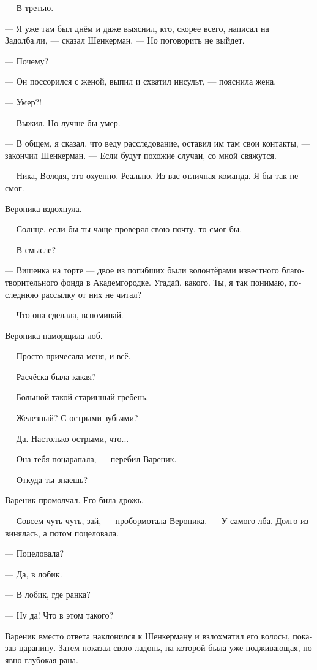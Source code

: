 \documentclass[a5paper,12pt,fleqn]{extbook}\usepackage{cooltooltips}\usepackage{polyglossia}\setdefaultlanguage[babelshorthands=true]{russian}\setotherlanguage{english}\defaultfontfeatures{Ligatures=TeX,Mapping=tex-text} \usepackage{xcolor}\definecolor{lightgray}{HTML}{bbbbbb}\color{lightgray}\newcommand{\ml}[3]{\textenglish{\textcolor{black}{#3}}}
\newcommand{\asterism}{\vspace{1em}{\centering\Large\bfseries$\ast~\ast~\ast$\par}\vspace{1em}}
\newcommand{\textspace}{\vspace{1em}{\centering\Large\bfseries<...>\par}\vspace{1em}}
\begin{document}
--- В третью.

--- Я уже там был днём и даже выяснил, кто, скорее всего, написал на Задолба.ли, --- сказал Шенкерман.
--- Но поговорить не выйдет.

--- Почему?

--- Он поссорился с женой, выпил и схватил инсульт, --- пояснила жена.

--- Умер?!

--- Выжил.
Но лучше бы умер.

--- В общем, я сказал, что веду расследование, оставил им там свои контакты, --- закончил Шенкерман.
--- Если будут похожие случаи, со мной свяжутся.

--- Ника, Володя, это охуенно.
Реально.
Из вас отличная команда.
Я бы так не смог.

Вероника вздохнула.

--- Солнце, если бы ты чаще проверял свою почту, то смог бы.

--- В смысле?

--- Вишенка на торте --- двое из погибших были волонтёрами известного благотворительного фонда в Академгородке.
Угадай, какого.
Ты, я так понимаю, последнюю рассылку от них не читал?

\asterism

\textspace

--- Что она сделала, вспоминай.

Вероника наморщила лоб.

--- Просто причесала меня, и всё.

--- Расчёска была какая?

--- Большой такой старинный гребень.

--- Железный?
С острыми зубьями?

--- Да.
Настолько острыми, что...

--- Она тебя поцарапала, --- перебил Вареник.

--- Откуда ты знаешь?

Вареник промолчал.
Его била дрожь.

--- Совсем чуть-чуть, зай, --- пробормотала Вероника.
--- У самого лба.
Долго извинялась, а потом поцеловала.

--- Поцеловала?

--- Да, в лобик.

--- В лобик, где ранка?

--- Ну да!
Что в этом такого?

Вареник вместо ответа наклонился к Шенкерману и взлохматил его волосы, показав царапину.
Затем показал свою ладонь, на которой была уже подживающая, но явно глубокая рана.
\end{document}
